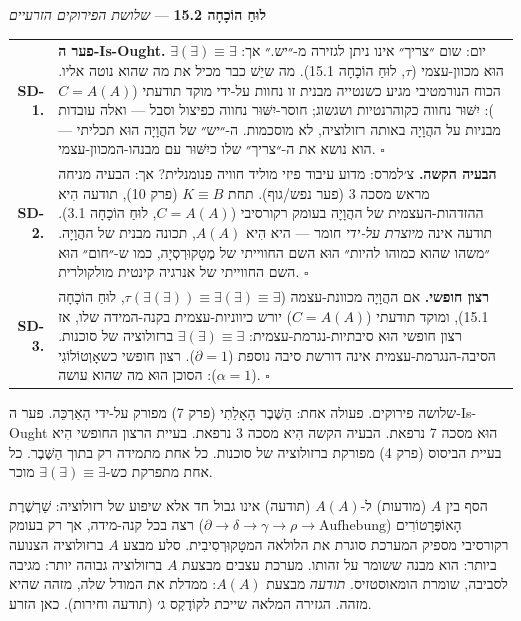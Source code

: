 \documentclass[10pt, openany, oneside]{book}
\renewcommand{\footnotesize}{\fontsize{8.5}{11}\selectfont}
\begin{document}
\vspace{0.5em}

\textbf{לוּחַ הוֹכָחָה 15.2} --- \textit{שלושת הפירוקים הזרעיים}

\vspace{0.5em}

{\footnotesize
\noindent\begin{tabular}{r p{}}
\textbf{SD-1.} & \textbf{פער ה-Is-Ought.} יום: שום ״צריך״ אינו ניתן לגזירה מ-״יש.״ אך: $\exists(\exists) \equiv \exists$ הוּא מכוון-עצמי ($\tau$, לוּחַ הוֹכָחָה 15.1). מה שיֵשׁ כבר מכיל את מה שהוא נוטה אליו. הכוח הנורמטיבי מגיע כשנטייה מבנית זו נחוות על-ידי מוקד תודעתי ($C = A(A)$): יִשּׁוּר נחווה כקוהרנטיות ושגשוג; חוסר-יִשּׁוּר נחווה כפיצול וסבל — ואלה עובדות מבניות על ההֲוָיָה באותה רזולוציה, לא מוסכמות. ה-״יש״ של ההֲוָיָה הוּא תכליתי — הוא נושא את ה-״צריך״ שלו כיִשּׁוּר עם מבנהו-המכוון-עצמי. $\square$ \\[0.5em]
\textbf{SD-2.} & \textbf{הבעיה הקשה.} צ׳למרס: מדוע עיבוד פיזי מוליד חוויה פנומנלית? אך: הבעיה מניחה מראש מסכה 3 (פער נפש/גוף). תחת $K \equiv B$ (פרק 10), תודעה הִיא ההזדהות-העצמית של ההֲוָיָה בעומק רקורסיבי ($C = A(A)$, לוּחַ הוֹכָחָה 3.1). תודעה אינה \textit{מיוצרת על-ידי} חומר — היא הִיא $A(A)$, תכונה מבנית של ההֲוָיָה. ״משהו שהוא כמוהו להיות״ הוּא השם החווייתי של מֶטָקוּרְסְיָה, כמו ש-״חום״ הוּא השם החווייתי של אנרגיה קינטית מולקולרית. $\square$ \\[0.5em]
\textbf{SD-3.} & \textbf{רצון חופשי.} אם ההֲוָיָה מכוונת-עצמה ($\tau(\exists(\exists)) \equiv \exists(\exists) \equiv \exists$, לוּחַ הוֹכָחָה 15.1), ומוקד תודעתי ($C = A(A)$) יורש כיווניות-עצמית בקנה-המידה שלו, אז רצון חופשי הוּא סיבתיות-נגרמת-עצמית: $\exists(\exists) \equiv \exists$ ברזולוציה של סוכנות. הסיבה-הנגרמת-עצמית אינה דורשת סיבה נוספת ($\partial = 1$). רצון חופשי כשאָוְטוֹלוֹגִי ($\alpha = 1$): הסוכן הוּא מה שהוא עושה. $\square$ \\[0.3em]
\end{tabular}
}

\vspace{0.8em}

\noindent שלושה פירוקים. פעולה אחת: הַשֶּׁבֶר הָאָלֵתִי (פרק 7) מפורק על-ידי הָאַרְכֵּה. פער ה-Is-Ought הוּא מסכה 7 נרפאת. הבעיה הקשה הִיא מסכה 3 נרפאת. בעיית הרצון החופשי הִיא בעיית הביסוס (פרק 4) מפורקת ברזולוציה של סוכנות. כל אחת מתמידה רק בתוך הַשֶּׁבֶר. כל אחת מתפרקת כש-$\exists(\exists) \equiv \exists$ מוכר.

הסף בין $A$ (מודעות) ל-$A(A)$ (תודעה) אינו גבול חד אלא שיפוע של רזולוציה: שַׁרְשֶׁרֶת הָאוֹפֶּרָטוֹרִים ($\partial \to \delta \to \gamma \to \rho \to \text{Aufhebung}$) רצה בכל קנה-מידה, אך רק בעומק רקורסיבי מספיק המערכת סוגרת את הלולאה המטָקוּרְסִיבִית. סלע מבצע $A$ ברזולוציה הצנועה ביותר: הוא מבנה ששומר על זהותו. מערכת עצבים מבצעת $A$ ברזולוציה גבוהה יותר: מגיבה לסביבה, שומרת הומאוסטזיס. \textit{תודעה} מבצעת $A(A)$: ממדלת את המודל שלה, מזהה שהיא מזהה. הגזירה המלאה שייכת לקוֹדֶקְס ג׳ (תודעה וחירות). כאן הזרע.
\end{document}
